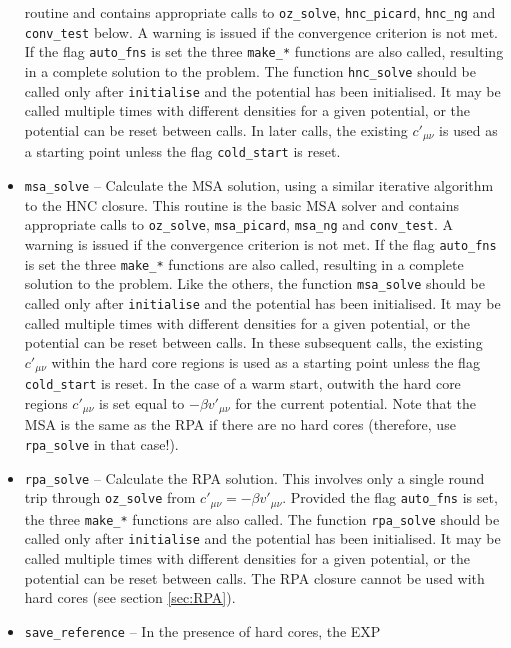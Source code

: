\documentclass[12pt,a4paper]{article}
\begin{document}
\begin{itemize}
  routine and contains appropriate calls to \verb+oz_solve+,
  \verb+hnc_picard+, \verb+hnc_ng+ and \verb+conv_test+ below.  A
  warning is issued if the convergence criterion is not met.  If the
  flag \verb+auto_fns+ is set the three \verb+make_*+ functions are
  also called, resulting in a complete solution to the problem.  The
  function \verb+hnc_solve+ should be called only after
  \verb+initialise+ and the potential has been initialised.  It may be
  called multiple times with different densities for a given
  potential, or the potential can be reset between calls.  In
  later calls, the existing $c'_{\mu\nu}$ is used as a
  starting point unless the flag \verb+cold_start+ is reset.
%
\item\verb+msa_solve+ -- Calculate the MSA solution, using a similar
  iterative algorithm to the HNC closure. This routine is the basic
  MSA solver and contains appropriate calls to \verb+oz_solve+,
  \verb+msa_picard+, \verb+msa_ng+ and \verb+conv_test+.  A warning is
  issued if the convergence criterion is not met.  If the flag
  \verb+auto_fns+ is set the three \verb+make_*+ functions are also
  called, resulting in a complete solution to the problem.  Like the
  others, the function \verb+msa_solve+ should be called only after
  \verb+initialise+ and the potential has been initialised.  It may be
  called multiple times with different densities for a given
  potential, or the potential can be reset between calls.  In these
  subsequent calls, the existing $c'_{\mu\nu}$ within the hard core
  regions is used as a starting point unless the flag
  \verb+cold_start+ is reset. In the case of a warm start, outwith the
  hard core regions $c'_{\mu\nu}$ is set equal to $-\beta
  v'_{\mu\nu}$ for the current potential. Note that the MSA is the
  same as the RPA if there are no hard cores (therefore, use
  \verb+rpa_solve+ in that case!).
%
\item\verb+rpa_solve+ -- Calculate the RPA solution.  This involves
  only a single round trip through \verb+oz_solve+ from $c'_{\mu\nu} =
  -\beta v'_{\mu\nu}$.  Provided the flag \verb+auto_fns+ is set,
  the three \verb+make_*+ functions are also called. The function
  \verb+rpa_solve+ should be called only after \verb+initialise+ and
  the potential has been initialised.  It may be called multiple times
  with different densities for a given potential, or the potential can
  be reset between calls.  The RPA closure cannot be used with hard
  cores (see section \ref{sec:RPA}).
%
\item\verb+save_reference+ -- In the presence of hard cores, the EXP

\end{itemize}
\end{document}

